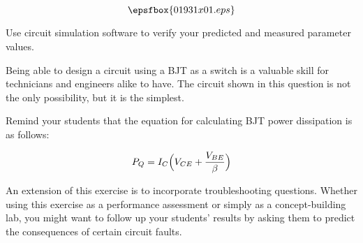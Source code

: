 

$$\epsfbox{01931x01.eps}$$

\vfil \eject






Use circuit simulation software to verify your predicted and measured parameter values.







Being able to design a circuit using a BJT as a switch is a valuable skill for technicians and engineers alike to have.  The circuit shown in this question is not the only possibility, but it is the simplest.

Remind your students that the equation for calculating BJT power dissipation is as follows:

$$P_Q = I_C \Bigl(V_{CE} + {V_{BE} \over \beta}\Bigr)$$

An extension of this exercise is to incorporate troubleshooting questions.  Whether using this exercise as a performance assessment or simply as a concept-building lab, you might want to follow up your students' results by asking them to predict the consequences of certain circuit faults.





